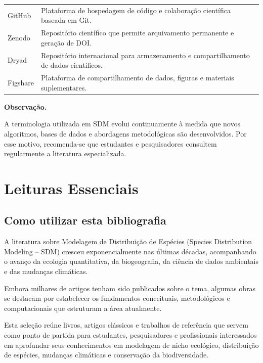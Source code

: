 \documentclass{ueap-sdm}
\begin{document}
\begin{longtable}{
		p{}
		p{}
	}
	GitHub &
	Plataforma de hospedagem de código e colaboração científica baseada em Git.
	\\
	
	Zenodo &
	Repositório científico que permite arquivamento permanente e geração de DOI.
	\\
	
	Dryad &
	Repositório internacional para armazenamento e compartilhamento de dados científicos.
	\\
	
	Figshare &
	Plataforma de compartilhamento de dados, figuras e materiais suplementares.
	\\
	
	\bottomrule
	
\end{longtable}

\begin{conceito}
	\textbf{Observação.}
	
	A terminologia utilizada em SDM evolui continuamente à medida que novos
	algoritmos, bases de dados e abordagens metodológicas são desenvolvidos.
	Por esse motivo, recomenda-se que estudantes e pesquisadores consultem
	regularmente a literatura especializada.
\end{conceito}

\chapter*{Leituras Essenciais}

\section*{Como utilizar esta bibliografia}

A literatura sobre Modelagem de Distribuição de Espécies (Species Distribution
Modeling -- SDM) cresceu exponencialmente nas últimas décadas, acompanhando o
avanço da ecologia quantitativa, da biogeografia, da ciência de dados
ambientais e das mudanças climáticas.

Embora milhares de artigos tenham sido publicados sobre o tema, algumas obras
se destacam por estabelecer os fundamentos conceituais, metodológicos e
computacionais que estruturam a área atualmente.

Esta seleção reúne livros, artigos clássicos e trabalhos de referência que
servem como ponto de partida para estudantes, pesquisadores e profissionais
interessados em aprofundar seus conhecimentos em modelagem de nicho ecológico,
distribuição de espécies, mudanças climáticas e conservação da biodiversidade.
\end{document}
